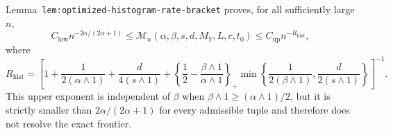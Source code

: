 Lemma~\texttt{lem:optimized-histogram-rate-bracket} proves, for all sufficiently large \(n\),
\[
C_{\mathrm{low}}n^{-2\alpha/(2\alpha+1)}
\le
\mathcal M_n(\alpha,\beta,s,d,M_Y,L,c,t_0)
\le
C_{\mathrm{up}}n^{-R_{\mathrm{hist}}},
\]
where
\[
R_{\mathrm{hist}}=
\left[
1+\frac1{2(\alpha\wedge1)}+\frac d{4(s\wedge1)}
+\left\{\frac12-\frac{\beta\wedge1}{\alpha\wedge1}\right\}_+
\min\left\{\frac1{2(\beta\wedge1)},\frac d{2(s\wedge1)}\right\}
\right]^{-1}.
\]
This upper exponent is independent of \(\beta\) when \(\beta\wedge1\ge(\alpha\wedge1)/2\), but it is strictly smaller than \(2\alpha/(2\alpha+1)\) for every admissible tuple and therefore does not resolve the exact frontier.